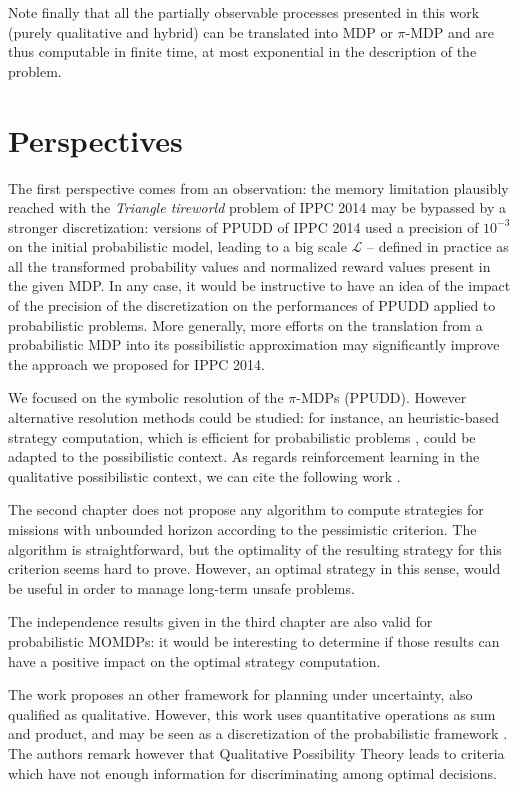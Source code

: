 Note finally that all the partially observable processes presented in this work
(purely qualitative and hybrid)
can be translated into MDP or $\pi$-MDP
and are thus computable in finite time, 
at most exponential in the description of the problem.
\section*{Perspectives}
The first perspective comes from an observation:
the memory limitation plausibly reached with the \textit{Triangle tireworld} 
problem of IPPC 2014 may be bypassed by a stronger discretization: 
versions of PPUDD of IPPC 2014 used a precision of $10^{-3}$
on the initial probabilistic model, leading to a big scale $\mathcal{L}$
-- defined in practice as all the transformed probability values and normalized reward	 values
present in the given MDP.
In any case, it would be instructive to have an idea
of the impact of the precision of the discretization
on the performances of PPUDD applied to probabilistic problems. 
More generally, more efforts 
on the translation 
from a probabilistic MDP into 
its possibilistic approximation
may significantly improve 
the approach we proposed for IPPC 2014.

We focused on the symbolic resolution of the $\pi$-MDPs (PPUDD).
However alternative resolution methods could be studied:
for instance, an heuristic-based strategy computation, 
which is efficient for probabilistic problems \cite{DBLP:conf/aaai/Teichteil-KonigsbuchVI11},
could be adapted to the possibilistic context.
As regards reinforcement learning 
in the qualitative possibilistic context,
we can cite the following work \cite{DBLP:conf/fuzzIEEE/Sabbadin01}.

The second chapter does not propose any algorithm
to compute strategies 
for missions with unbounded horizon
according to the pessimistic criterion. 
The algorithm is straightforward, 
but the optimality of the resulting strategy 
for this criterion
seems hard to prove.
However, an optimal strategy 
in this sense,
would be useful
in order to manage 
long-term unsafe problems. 

The independence results given in the third chapter
are also valid for probabilistic MOMDPs: 
it would be interesting to determine if those results can have
a positive impact on the optimal strategy computation.

The work \cite{Bonet:2002:QMP:2073876.2073884} proposes an other framework
for planning under uncertainty, also qualified as qualitative. 
However, this work uses quantitative operations
as sum and product, and may be seen as a discretization of the probabilistic framework \cite{Wilson:1995:OMC:2074158.2074221}.
The authors remark however that Qualitative Possibility Theory leads to 
criteria which have not enough information for discriminating
among optimal decisions.

